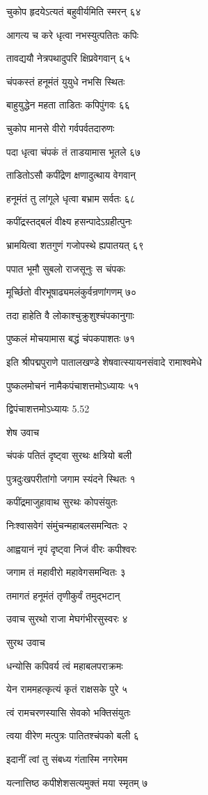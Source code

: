 चुकोप हृदयेऽत्यतं बहुवीर्यमिति स्मरन् ६४

आगत्य च करे धृत्वा नभस्युत्पतितः कपिः

तावद्ययौ नेत्रपथादुपरि क्षिप्रवेगवान् ६५

चंपकस्तं हनूमंतं युयुधे नभसि स्थितः

बाहुयुद्धेन महता ताडितः कपिपुंगवः ६६

चुकोप मानसे वीरो गर्वपर्वतदारुणः

पदा धृत्वा चंपकं तं ताडयामास भूतले ६७

ताडितोऽसौ कपींद्रेण क्षणादुत्थाय वेगवान्

हनूमंतं तु लांगूले धृत्वा बभ्राम सर्वतः ६८

कपींद्रस्तद्बलं वीक्ष्य हसन्पादेऽग्रहीत्पुनः

भ्रामयित्वा शतगुणं गजोपस्थे ह्यपातयत् ६९

पपात भूमौ सुबलो राजसूनुः स चंपकः

मूर्च्छितो वीरभूषाढ्यमलंकुर्वन्रणांगणम् ७०

तदा हाहेति वै लोकाश्चुक्रुशुश्चंपकानुगाः

पुष्कलं मोचयामास बद्धं चंपकपाशतः ७१

इति श्रीपद्मपुराणे पातालखण्डे शेषवात्स्यायनसंवादे रामाश्वमेधे

पुष्कलमोचनं नामैकपंचाशत्तमोऽध्यायः ५१

द्विपंचाशत्तमोऽध्यायः 5.52

शेष उवाच

चंपकं पतितं दृष्ट्वा सुरथः क्षत्रियो बली

पुत्रदुःखपरीतांगो जगाम स्यंदने स्थितः १

कपींद्रमाजुहावाथ सुरथः कोपसंयुतः

निःश्वासवेगं संमुंचन्महाबलसमन्वितः २

आह्वयानं नृपं दृष्ट्वा निजं वीरः कपीश्वरः

जगाम तं महावीरो महावेगसमन्वितः ३

तमागतं हनूमंतं तृणीकुर्वं तमुद्भटान्

उवाच सुरथो राजा मेघगंभीरसुस्वरः ४

सुरथ उवाच

धन्योसि कपिवर्य त्वं महाबलपराक्रमः

येन राममहत्कृत्यं कृतं राक्षसके पुरे ५

त्वं रामचरणस्यासि सेवको भक्तिसंयुतः

त्वया वीरेण मत्पुत्रः पातितश्चंपको बली ६

इदानीं त्वां तु संबध्य गंतास्मि नगरेमम

यत्नात्तिष्ठ कपीशेशसत्यमुक्तं मया स्मृतम् ७

